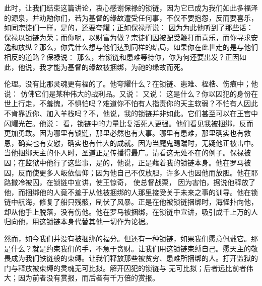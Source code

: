 此时，让我们结束这篇讲论，衷心感谢保禄的锁链，因为它已成为我们如此多福泽的源泉，并劝勉你们，若为基督的缘故遭受任何事，不仅不要抱怨，反而要喜乐，如同宗徒们一样，是的，还要夸耀；正如保禄所说：  因为为此他听到了那些话： 保禄以锁链为荣；而你呢，以财富为傲？宗徒们因被配受鞭打而喜乐，而你寻求安逸和放纵？那么，你凭什么想与他们达到同样的结局，如果你在此世走的是与他们相反的道路？保禄说：  那么，若锁链和患难等待你，你为何还要出发？正因如此，他说，我才能为基督的缘故被捆绑，为祂的缘故而死。 \par

伦理。没有比那灵魂更有福的了。他夸耀什么？在锁链、患难、桎梏、伤痕中；他说：  仿佛它们是某种伟大的战利品。又说：  又说：  这是什么？你以囚犯的身份在世上行走，不羞愧，不惧怕吗？难道你不怕有人指责你的天主软弱？不怕有人因此不肯靠近你、加入羊栈吗？不，他说，我的锁链并非如此。它们甚至可以在王宫中闪耀光芒。他说：  看，锁链中的力量比复活死人更强。他们看见我被捆绑，反而更加勇敢。因为哪里有锁链，那里必然也有大事。哪里有患难，那里确实也有救恩，确实也有安慰，确实也有伟大的成就。因为当魔鬼踢踹时，无疑他正被击中。当他捆绑天主的仆人时，圣道正是传播得最广。请看这无处不在的例子。保禄被囚；在监狱中他行了这些事，是的，他说，正是藉着我的锁链本身。他在罗马被囚，反而使更多人皈依信仰；因为他自己不仅放胆，许多人也因他而放胆。他在耶路撒冷被囚，在锁链中宣讲，使王惊奇， 使总督战栗， 因为害怕，据说他释放了他，而捆绑他的人竟不羞于从他被捆绑的人那里接受关于未来之事的训导。他在锁链中航海，修复了船只残骸，制伏了风暴。正是在他被锁链捆绑时，海怪扑向他，却从他手上脱落，没有伤他。他在罗马被捆绑，在锁链中宣讲，吸引成千上万的人归向他，用这锁链本身代替其他一切作为论据。\par

然而，如今我们并没有被捆绑的福分。但还有一种锁链，如果我们愿意佩戴它。那是什么？就是约束我们的手，不急于贪财。让我们用这锁链束缚自己。愿天主的敬畏成为我们铁链般的束缚。让我们释放那些被贫穷、患难所捆绑的人。打开监狱的门与释放被束缚的灵魂无可比拟。解开囚犯的锁链与  无可比拟；后者远比前者伟大；因为前者没有赏报，而后者有千万倍的赏报。\par

